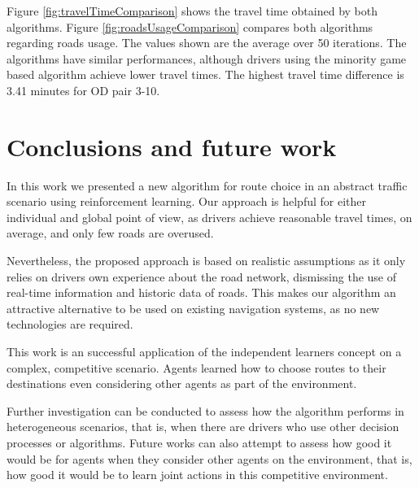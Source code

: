 \documentclass[12pt]{article}
\begin{document}
Figure \ref{fig:travelTimeComparison} shows the travel time obtained by both algorithms. Figure \ref{fig:roadsUsageComparison} compares both algorithms regarding roads usage. The values shown are the average over 50 iterations. The algorithms have similar performances, although drivers using the minority game based algorithm achieve lower travel times. The highest travel time difference is 3.41 minutes for OD pair 3-10.



\section{Conclusions and future work}
\label{sec:conclusions}

In this work we presented a new algorithm for route choice in an abstract traffic scenario using reinforcement learning. Our approach is helpful for either individual and global point of view, as drivers achieve reasonable travel times, on average, and only few roads are overused.

Nevertheless, the proposed approach is based on realistic assumptions as it only relies on drivers own experience about the road network, dismissing the use of real-time information and historic data of roads. This makes our algorithm an attractive alternative to be used on existing navigation systems, as no new technologies are required.

This work is an successful application of the independent learners concept on a complex, competitive scenario. Agents learned how to choose routes to their destinations even considering other agents as part of the environment.

Further investigation can be conducted to assess how the algorithm performs in heterogeneous scenarios, that is, when there are drivers who use other decision processes or algorithms. Future works can also attempt to assess how good it would be for agents when they consider other agents on the environment, that is, how good it would be to learn joint actions in this competitive environment.


 
\end{document}
